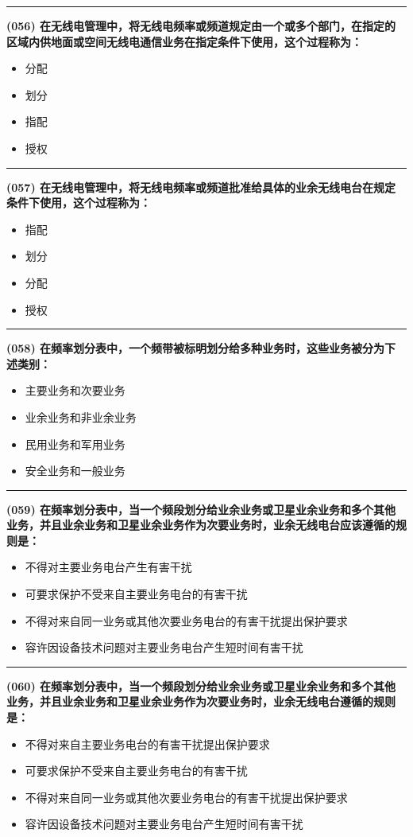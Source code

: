 \documentclass[twocolumn]{ctexart}  %
\begin{document}
\noindent\rule{0.5\textwidth}{1pt}
\heiti \textbf{(056) 在无线电管理中，将无线电频率或频道规定由一个或多个部门，在指定的区域内供地面或空间无线电通信业务在指定条件下使用，这个过程称为：} \songti {\color{gray} [LK0114] }
\begin{itemize}
	\item  分配
	\item  划分
	\item  指配
	\item  授权
\end{itemize}


\noindent\rule{0.5\textwidth}{1pt}
\heiti \textbf{(057) 在无线电管理中，将无线电频率或频道批准给具体的业余无线电台在规定条件下使用，这个过程称为：} \songti {\color{gray} [LK0115] }
\begin{itemize}
	\item  指配
	\item  划分
	\item  分配
	\item  授权
\end{itemize}


\noindent\rule{0.5\textwidth}{1pt}
\heiti \textbf{(058) 在频率划分表中，一个频带被标明划分给多种业务时，这些业务被分为下述类别：} \songti {\color{gray} [LK0140] }
\begin{itemize}
	\item  主要业务和次要业务
	\item  业余业务和非业余业务
	\item  民用业务和军用业务
	\item  安全业务和一般业务
\end{itemize}


\noindent\rule{0.5\textwidth}{1pt}
\heiti \textbf{(059) 在频率划分表中，当一个频段划分给业余业务或卫星业余业务和多个其他业务，并且业余业务和卫星业余业务作为次要业务时，业余无线电台应该遵循的规则是：} \songti {\color{gray} [LK0141] }
\begin{itemize}
	\item  不得对主要业务电台产生有害干扰
	\item  可要求保护不受来自主要业务电台的有害干扰
	\item  不得对来自同一业务或其他次要业务电台的有害干扰提出保护要求
	\item  容许因设备技术问题对主要业务电台产生短时间有害干扰
\end{itemize}


\noindent\rule{0.5\textwidth}{1pt}
\heiti \textbf{(060) 在频率划分表中，当一个频段划分给业余业务或卫星业余业务和多个其他业务，并且业余业务和卫星业余业务作为次要业务时，业余无线电台遵循的规则是：} \songti {\color{gray} [LK0142] }
\begin{itemize}
	\item  不得对来自主要业务电台的有害干扰提出保护要求
	\item  可要求保护不受来自主要业务电台的有害干扰
	\item  不得对来自同一业务或其他次要业务电台的有害干扰提出保护要求
	\item  容许因设备技术问题对主要业务电台产生短时间有害干扰
\end{itemize}
\end{document}
